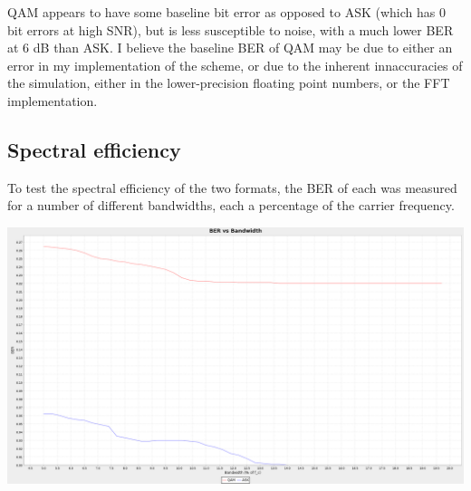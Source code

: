 \documentclass{article}
\begin{document}
QAM appears to have some baseline bit error as opposed to ASK (which has 0 bit errors at high SNR), but is less susceptible to noise, with a much lower BER at 6 dB than ASK. I believe the baseline BER of QAM may be due to either an error in my implementation of the scheme, or due to the inherent innaccuracies of the simulation, either in the lower-precision floating point numbers, or the FFT implementation.

\subsection{Spectral efficiency}
To test the spectral efficiency of the two formats, the BER of each was measured for a number of different bandwidths, each a percentage of the carrier frequency. 

\noindent
\includegraphics[width=\textwidth]{figures/bandwidth.png}
\end{document}
